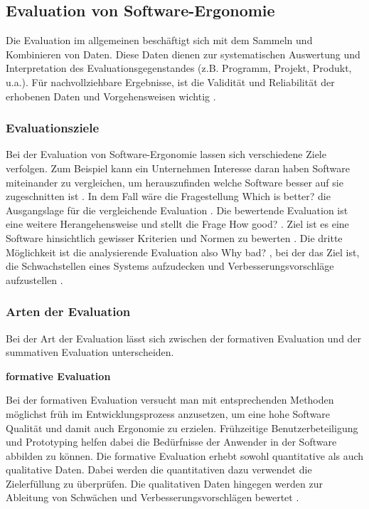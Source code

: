 \subsection{Evaluation von Software-Ergonomie}
Die Evaluation im allgemeinen beschäftigt sich mit dem Sammeln und Kombinieren von Daten. Diese Daten dienen zur systematischen Auswertung und Interpretation des Evaluationsgegenstandes (z.B. Programm, Projekt, Produkt, u.a.). Für nachvollziehbare Ergebnisse, ist die Validität und Reliabilität der erhobenen Daten und Vorgehensweisen wichtig \citep[vgl.][7]{Hegner2003}.

\subsubsection{Evaluationsziele}

Bei der Evaluation von Software-Ergonomie lassen sich verschiedene Ziele verfolgen. Zum Beispiel kann ein Unternehmen Interesse daran haben Software miteinander zu vergleichen, um herauszufinden welche Software besser auf sie zugeschnitten ist \citep[vgl.][]{Gediga2002evaluation}. In dem Fall wäre die Fragestellung \glqq Which is better?\grqq{} die Ausgangslage für die vergleichende Evaluation \citep[vgl.][9]{Hegner2003}. Die bewertende Evaluation ist eine weitere Herangehensweise und stellt die Frage \glqq How good?\grqq{} \citep[vgl.][9]{Hegner2003}. Ziel ist es eine Software hinsichtlich gewisser Kriterien und Normen zu bewerten \citep[vgl.][]{Gediga2002evaluation}. Die dritte Möglichkeit ist die analysierende Evaluation also \glqq Why bad?\grqq{} \citep[vgl.][9]{Hegner2003}, bei der das Ziel ist, die Schwachstellen eines Systems aufzudecken und Verbesserungsvorschläge aufzustellen \citep[vgl.][]{Gediga2002evaluation}.


\subsubsection{Arten der Evaluation}
Bei der Art der Evaluation lässt sich zwischen der formativen Evaluation und der summativen Evaluation unterscheiden.

\textbf{formative Evaluation}

Bei der formativen Evaluation versucht man mit entsprechenden Methoden möglichst früh im Entwicklungsprozess anzusetzen, um eine hohe Software Qualität und damit auch Ergonomie zu erzielen. Frühzeitige Benutzerbeteiligung und Prototyping helfen dabei die Bedürfnisse der Anwender in der Software abbilden zu können. Die formative Evaluation erhebt sowohl quantitative als auch qualitative Daten. Dabei werden die quantitativen dazu verwendet die Zielerfüllung zu überprüfen. Die qualitativen Daten hingegen werden zur Ableitung von Schwächen und Verbesserungsvorschlägen bewertet \citep[vgl.][7]{Hegner2003}.

